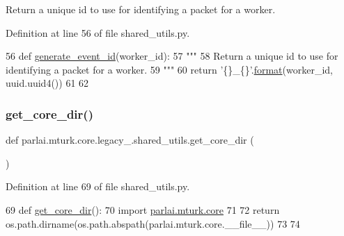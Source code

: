 \begin{DoxyVerb}Return a unique id to use for identifying a packet for a worker.
\end{DoxyVerb}
 

Definition at line 56 of file shared\+\_\+utils.\+py.


\begin{DoxyCode}
56 \textcolor{keyword}{def }\hyperlink{namespaceparlai_1_1mturk_1_1core_1_1shared__utils_aba2e4d48063dafc80e931f8925dbb755}{generate\_event\_id}(worker\_id):
57     \textcolor{stringliteral}{"""}
58 \textcolor{stringliteral}{    Return a unique id to use for identifying a packet for a worker.}
59 \textcolor{stringliteral}{    """}
60     \textcolor{keywordflow}{return} \textcolor{stringliteral}{'\{\}\_\{\}'}.\hyperlink{namespaceparlai_1_1mturk_1_1core_1_1shared__utils_a9cd2c4b48b3efc5296be64d403e00151}{format}(worker\_id, uuid.uuid4())
61 
62 
\end{DoxyCode}
\mbox{\label{namespaceparlai_1_1mturk_1_1core_1_1legacy__2018_1_1shared__utils_a46db6c6ce07c08b84777eaf63cf50608}} 
\subsubsection{\texorpdfstring{get\+\_\+core\+\_\+dir()}{get\_core\_dir()}}
{\footnotesize\ttfamily def parlai.\+mturk.\+core.\+legacy\+\_.\+shared\+\_\+utils.\+get\+\_\+core\+\_\+dir (\begin{DoxyParamCaption}{ }\end{DoxyParamCaption})}



Definition at line 69 of file shared\+\_\+utils.\+py.


\begin{DoxyCode}
69 \textcolor{keyword}{def }\hyperlink{namespaceparlai_1_1mturk_1_1core_1_1shared__utils_ac4e340ccc66c691fdd294c734dae0c5d}{get\_core\_dir}():
70     \textcolor{keyword}{import} \hyperlink{namespaceparlai_1_1mturk_1_1core}{parlai.mturk.core}
71 
72     \textcolor{keywordflow}{return} os.path.dirname(os.path.abspath(parlai.mturk.core.\_\_file\_\_))
73 
74 
\end{DoxyCode}
\mbox{\label{namespaceparlai_1_1mturk_1_1core_1_1legacy__2018_1_1shared__utils_ad4874994d87b965b1bc462e1d55aadd3}} 
